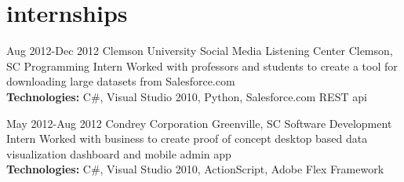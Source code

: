 
\section{internships}

\begin{entrylist}


\workentry
{Aug 2012-Dec 2012}
{Clemson University Social Media Listening Center}
{Clemson, SC}
{Programming Intern}
{Worked with professors and students to create a tool for downloading large datasets from Salesforce.com \\
\textbf{Technologies:} C\#, Visual Studio 2010, Python, Salesforce.com REST api}

\workentry
{May 2012-Aug 2012}
{Condrey Corporation}
{Greenville, SC}
{Software Development Intern}
{Worked with business to create proof of concept desktop based data visualization dashboard and mobile admin app \\
\textbf{Technologies:} C\#, Visual Studio 2010, ActionScript, Adobe Flex Framework}


\end{entrylist}
